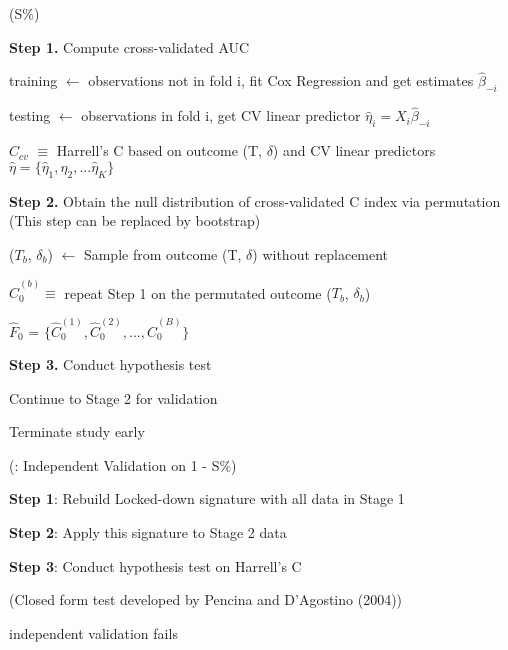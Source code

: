 
\begin{algorithm}[h]
\Begin(S$\%$)
{
			\vspace{0.5cm}
			\textbf{Step 1.} Compute cross-validated AUC 
			\par {} 
			{
				\par training $\leftarrow$ observations not in fold i, fit Cox Regression and get estimates $\hat{\beta}_{-i}$
				\par testing $\leftarrow$ observations in fold i, get CV linear predictor $\hat{\eta}_{i}= X_{i}\hat{\beta}_{-i}$				
			} 
			$\hat{C}_{cv}$ $\equiv$ Harrell's C based on outcome (T, $\delta$) and CV linear predictors $\hat{\eta} = \{\hat{\eta}_{1}, \hat{\eta}_{2}, ... \hat{\eta}_{K} \}$	
		
			\vspace{0.5cm}

			\textbf{Step 2.} Obtain the null distribution of cross-validated C index via permutation (This step can be replaced by bootstrap)
			\par {}
			{
				($T_b$, $\delta_{b}$) $\leftarrow$ Sample from outcome (T, $\delta$) without replacement
				\par $\hat{C}_{0}^{(b)} \equiv$ repeat Step 1 on the permutated outcome ($T_b$, $\delta_{b}$)
			} 
			\par $\hat{F}_0$ = $\{ \hat{C}_{0}^{(1)}, \hat{C}_{0}^{(2)}, ... , \hat{C}_{0}^{(B)} \}$

		\vspace{0.5cm}	

		\textbf{Step 3.} Conduct hypothesis test
		\par {}
		{
			\par Continue to Stage 2 for validation
			}
		\Else
		{
			Terminate study early
		}
}

\vspace{0.5cm}

\Begin(: Independent Validation on 1 - S$\%$){
	\vspace{0.5cm}
	\par \textbf{Step 1}: Rebuild Locked-down signature with all data in Stage 1
	\vspace{0.5cm}
	\par \textbf{Step 2}: Apply this signature to Stage 2 data
	\vspace{0.5cm}
	\par \textbf{Step 3}: Conduct hypothesis test on Harrell's C 
	\par (Closed form test developed by Pencina and D'Agostino (2004))
	\par {}
	\Else
	{independent validation fails}
}
\end{algorithm}
